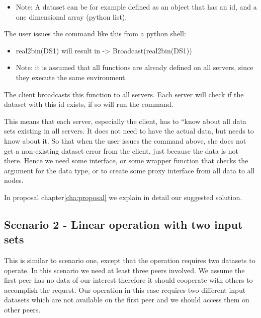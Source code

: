 \begin{itemize}
\item Note: A dataset can be for example defined as an object that has an id, and a one dimensional array (python list).
\end{itemize}

The user issues the command like this from a python shell: 

\begin{itemize}
\item real2bin(DS1) will result in -> Broadcast(real2bin(DS1))
\item Note: it is assumed that all functions are already defined on all servers, since they execute the same environment.
\end{itemize}

The client broadcasts this function to all servers. 
Each server will check if the dataset with this id exists, if so will run the command. 

This means that each server, especially the client, has to “know about all data sets existing in all servers.
It does not need to have the actual data, but needs to know about it. So that when the user issues the command
above, she does not get a non-existing dataset error from the client, just because the data is not
there. Hence we need some interface, or some wrapper function that checks the argument for the data type, or to 
create some proxy interface from all data to all nodes.

In proposal chapter\ref{cha:proposal} we explain in detail our suggested solution.

\subsection{Scenario 2 - Linear operation with two input sets}
\label{sc:sc2}
This is similar to scenario one, except that the operation requires two datasets to operate. 
In this scenario we need at least three peers involved. We assume the first peer has no
data of our interest therefore it should cooperate with others to accomplish the request. 
Our operation in this case requires two 
different input datasets which are not available on the first peer and we should access them on other peers. 



